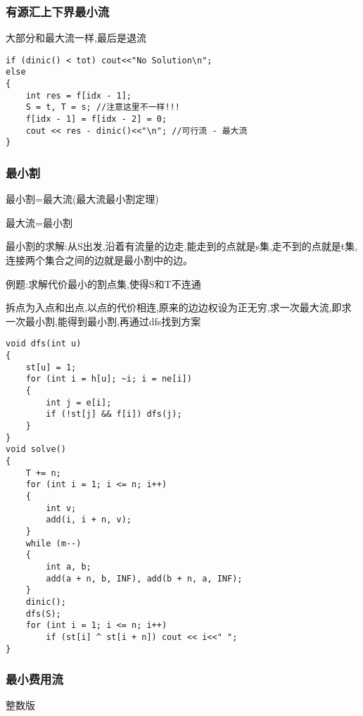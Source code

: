 \documentclass[a4paper, fontset=none]{ctexart}
\begin{document}
\subsubsection{有源汇上下界最小流}

大部分和最大流一样,最后是退流

\begin{verbatim}
if (dinic() < tot) cout<<"No Solution\n";
else
{
    int res = f[idx - 1];
    S = t, T = s; //注意这里不一样!!!
    f[idx - 1] = f[idx - 2] = 0;
    cout << res - dinic()<<"\n"; //可行流 - 最大流
}
\end{verbatim}
\subsubsection{最小割}

最小割=最大流(最大流最小割定理)

最大流=最小割

最小割的求解:从S出发,沿着有流量的边走,能走到的点就是s集,走不到的点就是t集,连接两个集合之间的边就是最小割中的边。

例题:求解代价最小的割点集,使得S和T不连通

拆点为入点和出点,以点的代价相连,原来的边边权设为正无穷,求一次最大流,即求一次最小割,能得到最小割,再通过dfs找到方案

\begin{verbatim}
void dfs(int u)
{
    st[u] = 1;
    for (int i = h[u]; ~i; i = ne[i])
    {
        int j = e[i];
        if (!st[j] && f[i]) dfs(j);
    }
}
void solve()
{
    T += n;
    for (int i = 1; i <= n; i++)
    {
        int v;
        add(i, i + n, v);
    }
    while (m--)
    {
        int a, b;
        add(a + n, b, INF), add(b + n, a, INF);
    }
    dinic();
    dfs(S);
    for (int i = 1; i <= n; i++)
        if (st[i] ^ st[i + n]) cout << i<<" ";
}
\end{verbatim}
\subsubsection{最小费用流}

整数版
\end{document}
